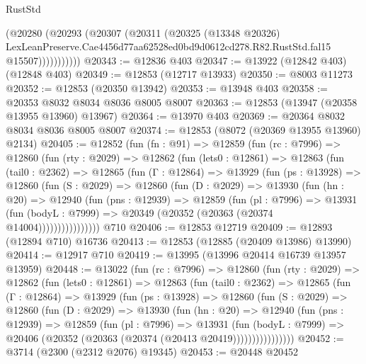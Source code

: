 \begin{lexlean}{RustStd}
\begin{coremodule}
                (@20280
                  (@20293
                    (@20307
                      (@20311
                        (@20325
                          (@13348 @20326)
                          LexLeanPreserve.Cae4456d77aa62528ed0bd9d0612cd278.R82.RustStd.fal15
                          @15507)))))))))))
@20343 := @12836 @403
@20347 := @13922 (@12842 @403) (@12848 @403)
@20349 := @12853 (@12717 @13933)
@20350 := @8003 @11273
@20352 := @12853 (@20350 @13942)
@20353 := @13948 @403
@20358 := @20353 @8032 @8034 @8036 @8005 @8007
@20363 := @12853 (@13947 (@20358 @13955 @13960) @13967)
@20364 := @13970 @403
@20369 := @20364 @8032 @8034 @8036 @8005 @8007
@20374 := @12853 (@8072 (@20369 @13955 @13960) @2134)
@20405 := @12852
    (fun (fn : @91) =>
    @12859
      (fun (rc : @7996) =>
      @12860
        (fun (rty : @2029) =>
        @12862
          (fun (lets0 : @12861) =>
          @12863
            (fun (tail0 : @2362) =>
            @12865
              (fun (Γ : @12864) =>
              @13929
                (fun (ps : @13928) =>
                @12860
                  (fun (S : @2029) =>
                  @12860
                    (fun (D : @2029) =>
                    @13930
                      (fun (hn : @20) =>
                      @12940
                        (fun (pns : @12939) =>
                        @12859
                          (fun (pl : @7996) =>
                          @13931
                            (fun (bodyL : @7999) =>
                            @20349 (@20352 (@20363 (@20374 @14004))))))))))))))))
    @710
@20406 := @12853 @12719
@20409 := @12893 (@12894 @710) @16736
@20413 := @12853 (@12885 (@20409 @13986) @13990)
@20414 := @12917 @710
@20419 := @13995 (@13996 @20414 @16739 @13957 @13959)
@20448 := @13022
    (fun (rc : @7996) =>
    @12860
      (fun (rty : @2029) =>
      @12862
        (fun (lets0 : @12861) =>
        @12863
          (fun (tail0 : @2362) =>
          @12865
            (fun (Γ : @12864) =>
            @13929
              (fun (ps : @13928) =>
              @12860
                (fun (S : @2029) =>
                @12860
                  (fun (D : @2029) =>
                  @13930
                    (fun (hn : @20) =>
                    @12940
                      (fun (pns : @12939) =>
                      @12859
                        (fun (pl : @7996) =>
                        @13931
                          (fun (bodyL : @7999) =>
                          @20406 (@20352 (@20363 (@20374 (@20413 @20419))))))))))))))))
@20452 := @3714 (@2300 (@2312 @2076) @19345)
@20453 := @20448 @20452

\end{coremodule}
\end{lexlean}
